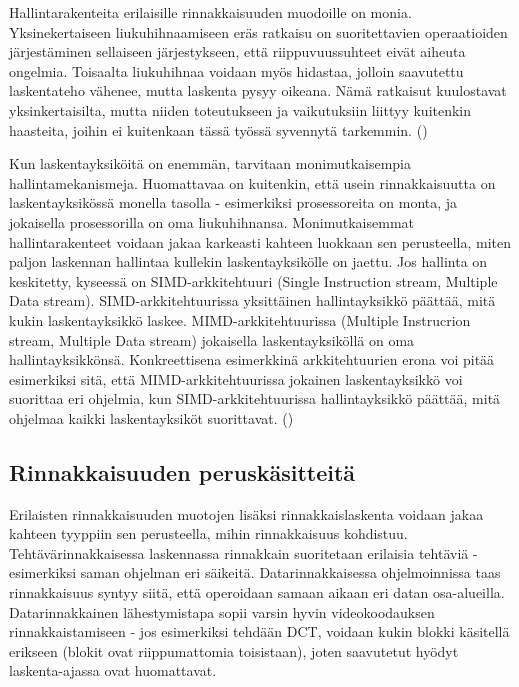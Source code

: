 Hallintarakenteita erilaisille rinnakkaisuuden muodoille on monia.
Yksinekertaiseen liukuhihnaamiseen eräs ratkaisu on suoritettavien operaatioiden
järjestäminen sellaiseen järjestykseen, että riippuvuussuhteet eivät
aiheuta ongelmia. Toisaalta liukuhihnaa voidaan myös hidastaa, jolloin
saavutettu laskentateho vähenee, mutta laskenta pysyy oikeana. Nämä
ratkaisut kuulostavat yksinkertaisilta, mutta niiden toteutukseen ja
vaikutuksiin liittyy kuitenkin haasteita, joihin ei kuitenkaan tässä työssä
syvennytä tarkemmin. (\cite{intro})

Kun laskentayksiköitä on enemmän, tarvitaan monimutkaisempia
hallintamekanismeja. Huomattavaa on kuitenkin, että usein rinnakkaisuutta on
laskentayksikössä monella tasolla - esimerkiksi prosessoreita on monta, ja
jokaisella prosessorilla on oma liukuhihnansa. Monimutkaisemmat
hallintarakenteet voidaan jakaa karkeasti kahteen luokkaan sen perusteella,
miten paljon laskennan hallintaa kullekin laskentayksikölle on jaettu. Jos
hallinta on keskitetty, kyseessä on SIMD-arkkitehtuuri (Single Instruction
stream, Multiple Data stream). SIMD-arkkitehtuurissa yksittäinen
hallintayksikkö päättää, mitä kukin laskentayksikkö laskee.
MIMD-arkkitehtuurissa (Multiple Instrucrion stream, Multiple Data stream)
jokaisella laskentayksiköllä on oma hallintayksikkönsä. Konkreettisena
esimerkkinä arkkitehtuurien erona voi pitää esimerkiksi sitä, että
MIMD-arkkitehtuurissa jokainen laskentayksikkö voi suorittaa eri ohjelmia, kun
SIMD-arkkitehtuurissa hallintayksikkö päättää, mitä ohjelmaa kaikki
laskentayksiköt suorittavat. (\cite{intro})

\subsection{Rinnakkaisuuden peruskäsitteitä}

Erilaisten rinnakkaisuuden muotojen lisäksi rinnakkaislaskenta voidaan jakaa
kahteen tyyppiin sen perusteella, mihin rinnakkaisuus kohdistuu.
Tehtävärinnakkaisessa laskennassa rinnakkain suoritetaan erilaisia
tehtäviä - esimerkiksi saman ohjelman eri säikeitä. Datarinnakkaisessa
ohjelmoinnissa taas rinnakkaisuus syntyy siitä, että operoidaan samaan aikaan
eri datan osa-alueilla. \cite{intro} Datarinnakkainen lähestymistapa sopii varsin hyvin
videokoodauksen rinnakkaistamiseen - jos esimerkiksi tehdään DCT, voidaan
kukin blokki käsitellä erikseen (blokit ovat riippumattomia toisistaan), joten
saavutetut hyödyt laskenta-ajassa ovat huomattavat.

